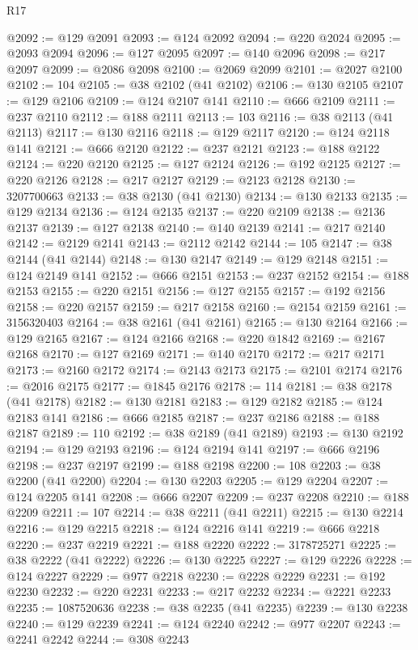 \begin{lexlean}{R17}
\begin{coremodule}
@2092 := @129 @2091
@2093 := @124 @2092
@2094 := @220 @2024
@2095 := @2093 @2094
@2096 := @127 @2095
@2097 := @140 @2096
@2098 := @217 @2097
@2099 := @2086 @2098
@2100 := @2069 @2099
@2101 := @2027 @2100
@2102 := 104
@2105 := @38 @2102 (@41 @2102)
@2106 := @130 @2105
@2107 := @129 @2106
@2109 := @124 @2107 @141
@2110 := @666 @2109
@2111 := @237 @2110
@2112 := @188 @2111
@2113 := 103
@2116 := @38 @2113 (@41 @2113)
@2117 := @130 @2116
@2118 := @129 @2117
@2120 := @124 @2118 @141
@2121 := @666 @2120
@2122 := @237 @2121
@2123 := @188 @2122
@2124 := @220 @2120
@2125 := @127 @2124
@2126 := @192 @2125
@2127 := @220 @2126
@2128 := @217 @2127
@2129 := @2123 @2128
@2130 := 3207700663
@2133 := @38 @2130 (@41 @2130)
@2134 := @130 @2133
@2135 := @129 @2134
@2136 := @124 @2135
@2137 := @220 @2109
@2138 := @2136 @2137
@2139 := @127 @2138
@2140 := @140 @2139
@2141 := @217 @2140
@2142 := @2129 @2141
@2143 := @2112 @2142
@2144 := 105
@2147 := @38 @2144 (@41 @2144)
@2148 := @130 @2147
@2149 := @129 @2148
@2151 := @124 @2149 @141
@2152 := @666 @2151
@2153 := @237 @2152
@2154 := @188 @2153
@2155 := @220 @2151
@2156 := @127 @2155
@2157 := @192 @2156
@2158 := @220 @2157
@2159 := @217 @2158
@2160 := @2154 @2159
@2161 := 3156320403
@2164 := @38 @2161 (@41 @2161)
@2165 := @130 @2164
@2166 := @129 @2165
@2167 := @124 @2166
@2168 := @220 @1842
@2169 := @2167 @2168
@2170 := @127 @2169
@2171 := @140 @2170
@2172 := @217 @2171
@2173 := @2160 @2172
@2174 := @2143 @2173
@2175 := @2101 @2174
@2176 := @2016 @2175
@2177 := @1845 @2176
@2178 := 114
@2181 := @38 @2178 (@41 @2178)
@2182 := @130 @2181
@2183 := @129 @2182
@2185 := @124 @2183 @141
@2186 := @666 @2185
@2187 := @237 @2186
@2188 := @188 @2187
@2189 := 110
@2192 := @38 @2189 (@41 @2189)
@2193 := @130 @2192
@2194 := @129 @2193
@2196 := @124 @2194 @141
@2197 := @666 @2196
@2198 := @237 @2197
@2199 := @188 @2198
@2200 := 108
@2203 := @38 @2200 (@41 @2200)
@2204 := @130 @2203
@2205 := @129 @2204
@2207 := @124 @2205 @141
@2208 := @666 @2207
@2209 := @237 @2208
@2210 := @188 @2209
@2211 := 107
@2214 := @38 @2211 (@41 @2211)
@2215 := @130 @2214
@2216 := @129 @2215
@2218 := @124 @2216 @141
@2219 := @666 @2218
@2220 := @237 @2219
@2221 := @188 @2220
@2222 := 3178725271
@2225 := @38 @2222 (@41 @2222)
@2226 := @130 @2225
@2227 := @129 @2226
@2228 := @124 @2227
@2229 := @977 @2218
@2230 := @2228 @2229
@2231 := @192 @2230
@2232 := @220 @2231
@2233 := @217 @2232
@2234 := @2221 @2233
@2235 := 1087520636
@2238 := @38 @2235 (@41 @2235)
@2239 := @130 @2238
@2240 := @129 @2239
@2241 := @124 @2240
@2242 := @977 @2207
@2243 := @2241 @2242
@2244 := @308 @2243

\end{coremodule}
\end{lexlean}
